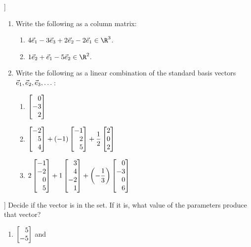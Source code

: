 \begin{exercises}
	\begin{problist}
		\prob[\beezer[VO.C10]] 
		\begin{enumerate}
			\item
				Write the following as a column matrix:
				\begin{enumerate}
					\item $4\sbasis{1} -3\sbasis{3} +2\sbasis{2} -2\sbasis{1}\in\R^3$.
					\item $1\sbasis{2} +\sbasis{1} -5\sbasis{2} \in\R^2$.
				\end{enumerate}
			\item
				Write the following as a linear combination of the standard basis
				vectors $\vec { e}_{1}, \vec { e}_{2}, \vec { e}_{3},\dots$:
				\begin{enumerate}
					\item $\mat{0\\-3\\2}$
					\item $\displaystyle
						\mat{-2\\5\\4} + (-1)\mat{-1\\2\\ 5} + \frac12\mat{2\\0\\2}$
					\item $\displaystyle
						2\mat{-1\\-2\\0\\ 5}
						+1\mat{3\\4\\-2\\ 1}
						+\left(-\frac13\right)\mat{0\\-3\\0\\ 6}$
				\end{enumerate}
		\end{enumerate}
		\prob[\hefferon[2.21,2.22]]
			Decide if the vector is in the set. If it is, what value of the
			parameters produce that vector?
			\begin{enumerate}
				\item
					$\mat{5\\-5}$ and

\end{enumerate}
\end{problist}
\end{exercises}
